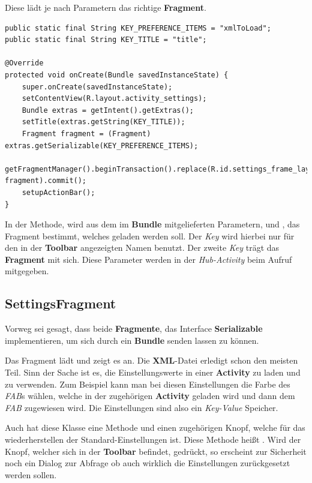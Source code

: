 Diese lädt je nach Parametern das richtige \textbf{Fragment}.

\begin{lstlisting}[caption={SettingsActivity onCreate() Methode},captionpos=b]
public static final String KEY_PREFERENCE_ITEMS = "xmlToLoad";
public static final String KEY_TITLE = "title";

@Override
protected void onCreate(Bundle savedInstanceState) {
	super.onCreate(savedInstanceState);
	setContentView(R.layout.activity_settings);
	Bundle extras = getIntent().getExtras();
	setTitle(extras.getString(KEY_TITLE));
	Fragment fragment = (Fragment) extras.getSerializable(KEY_PREFERENCE_ITEMS);
	getFragmentManager().beginTransaction().replace(R.id.settings_frame_layout, fragment).commit();
	setupActionBar();
}
\end{lstlisting} 

In der  Methode, wird aus dem im \textbf{Bundle}
mitgelieferten Parametern,  und , das Fragment
bestimmt, welches geladen werden soll. Der \emph{Key}  wird hierbei
nur für den in der \textbf{Toolbar} angezeigten Namen benutzt. Der zweite
\emph{Key} trägt das \textbf{Fragment} mit sich. Diese Parameter werden in der
\emph{Hub-Activity} beim Aufruf mitgegeben.

\subsection{SettingsFragment}

Vorweg sei gesagt, dass beide \textbf{Fragmente}, das Interface
\textbf{Serializable} implementieren, um sich durch ein \textbf{Bundle} senden
lassen zu können.

Das Fragment lädt  und zeigt es an. Die \textbf{XML}-Datei
erledigt schon den meisten Teil. Sinn der Sache ist es, die Einstellungswerte in
einer \textbf{Activity} zu laden und zu verwenden. Zum Beispiel kann man bei
diesen Einstellungen die Farbe des \emph{FAB}s wählen, welche in der zugehörigen
\textbf{Activity} geladen wird und dann dem \emph{FAB} zugewiesen wird. Die
Einstellungen sind also ein \emph{Key-Value} Speicher.

Auch hat diese Klasse eine Methode und einen zugehörigen Knopf, welche für das
wiederherstellen der Standard-Einstellungen ist. Diese Methode heißt
. Wird der Knopf, welcher sich in der
\textbf{Toolbar} befindet, gedrückt, so erscheint zur Sicherheit noch ein Dialog
zur Abfrage ob auch wirklich die Einstellungen zurückgesetzt werden sollen.

